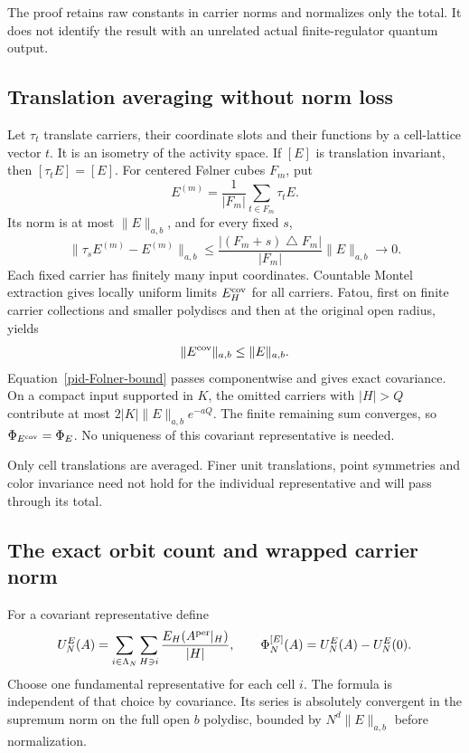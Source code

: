 \documentclass[11pt]{article}
\theoremstyle{remark}
\begin{document}
The proof retains raw constants in carrier norms and normalizes
only the total. It does not identify the result with an unrelated
actual finite-regulator quantum output.

\subsection{Translation averaging without norm loss}
\label{pid-averaging-section}

Let $\tau_t$ translate carriers, their coordinate slots and their
functions by a cell-lattice vector $t$. It is an isometry of the
activity space. If $[E]$ is translation invariant, then
$[\tau_tE]=[E]$. For centered F\o lner cubes $F_m$, put
\begin{equation}
 E^{(m)}=\frac1{|F_m|}\sum_{t\in F_m}\tau_tE.
 \label{pid-Cesaro}
\end{equation}
Its norm is at most $\|E\|_{a,b}$, and for every fixed $s$,
\begin{equation}
 \|\tau_sE^{(m)}-E^{(m)}\|_{a,b}
 \le\frac{|(F_m+s)\mathbin\triangle F_m|}{|F_m|}
                                      \|E\|_{a,b}\longrightarrow0.
 \label{pid-Folner-bound}
\end{equation}
Each fixed carrier has finitely many input coordinates. Countable
Montel extraction gives locally uniform limits $E_H^{\rm cov}$
for all carriers. Fatou, first on finite carrier collections and
smaller polydiscs and then at the original open radius, yields
\begin{equation}
 \|E^{\rm cov}\|_{a,b}\le\|E\|_{a,b}.
 \label{pid-covariant-bound}
\end{equation}
Equation~\eqref{pid-Folner-bound} passes componentwise and gives
exact covariance. On a compact input supported in $K$, the
omitted carriers with $|H|>Q$ contribute at most
$2|K|\|E\|_{a,b}e^{-aQ}$. The finite remaining sum converges,
so $\Phi_{E^{\rm cov}}=\Phi_E$. No uniqueness of this covariant
representative is needed.

Only cell translations are averaged. Finer unit translations,
point symmetries and color invariance need not hold for the
individual representative and will pass through its total.

\subsection{The exact orbit count and wrapped carrier norm}
\label{pid-orbit-section}

For a covariant representative define
\begin{equation}
 U_N^E(A)=\sum_{i\in\Lambda_N}\sum_{H\ni i}
                 \frac{E_H(A^{\rm per}|_H)}{|H|},
 \qquad
 \Phi_N^{[E]}(A)=U_N^E(A)-U_N^E(0).
 \label{pid-density}
\end{equation}
Choose one fundamental representative for each cell $i$. The
formula is independent of that choice by covariance. Its series
is absolutely convergent in the supremum norm on the full open
$b$ polydisc, bounded by $N^d\|E\|_{a,b}$ before normalization.
\end{document}
